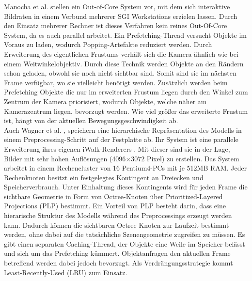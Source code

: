 Manocha et al. \cite{manocha} stellen ein Out-of-Core System vor, mit dem sich interaktive Bildraten in einem Verbund mehrerer SGI Workstations erzielen lassen. Durch den Einsatz mehrerer Rechner ist dieses Verfahren kein reines Out-Of-Core System, da es auch parallel arbeitet. Ein Prefetching-Thread versucht Objekte im Voraus zu laden, wodurch Popping-Artefakte reduziert werden. Durch Erweiterung des eigentlichen Frustums verhält sich die Kamera ähnlich wie bei einem Weitwinkelobjektiv. Durch diese Technik werden Objekte an den Rändern schon geladen, obwohl sie noch nicht sichtbar sind. Somit sind sie im nächsten Frame verfügbar, wo sie vielleicht benötigt werden. Zusätzlich werden beim Prefetching Objekte die nur im erweiterten Frustum liegen durch den Winkel zum Zentrum der Kamera priorisiert, wodurch Objekte, welche näher am Kamerazentrum liegen, bevorzugt werden. Wie viel größer das erweiterte Frustum ist, hängt von der aktuellen Bewegungsgeschwindigkeit ab.\\
Auch Wagner et al. \cite{wagner1}, \cite{wagner2} speichern eine hierarchische Repräsentation des Modells in einem Preprocessing-Schritt auf der Festplatte ab. Ihr System ist eine parallele Erweiterung ihres eigenen iWalk-Renderers \cite{iwalk}. Mit dieser sind sie in der Lage, Bilder mit sehr hohen Auflösungen (4096$\times$3072 Pixel) zu erstellen. Das System arbeitet in einem Rechencluster von 16 Pentium4-PCs mit je 512MB RAM. Jeder Rechenknoten besitzt ein festgelegtes Kontingent an Dreiecken und Speicherverbrauch. Unter Einhaltung dieses Kontingents wird für jeden Frame die sichtbare Geometrie in Form von Octree-Knoten über Prioritized-Layered Projections (PLP) \cite{plp} bestimmt. Ein Vorteil von PLP besteht darin, dass eine hierarische Struktur des Modells während des Preprocessings erzeugt werden kann. Dadurch können die sichtbaren Octree-Knoten zur Laufzeit bestimmt werden, ohne dabei auf die tatsächliche Szenengeometrie zugreifen zu müssen. Es gibt einen separaten Caching-Thread, der Objekte eine Weile im Speicher belässt und sich um das Prefetching kümmert. Objektanfragen den aktuellen Frame betreffend werden dabei jedoch bevorzugt. Als Verdrängungsstrategie kommt Least-Recently-Used (LRU) zum Einsatz.\\
